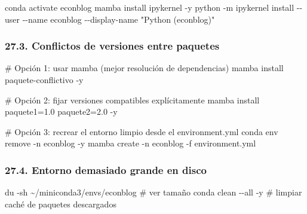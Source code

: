 \documentclass[
  doc,
  floatsintext,
  longtable,
  a4paper,
  nolmodern,
  notxfonts,
  notimes,
  12pt,
  colorlinks=true,linkcolor=blue,citecolor=blue,urlcolor=blue]{apa7}
\newenvironment{Shaded}{\begin{snugshade}}{\end{snugshade}}
\newcommand{\AttributeTok}[1]{\textcolor[rgb]{0.40,0.45,0.13}{#1}}
\newcommand{\CommentTok}[1]{\textcolor[rgb]{0.37,0.37,0.37}{#1}}
\newcommand{\ExtensionTok}[1]{\textcolor[rgb]{0.00,0.23,0.31}{#1}}
\newcommand{\FunctionTok}[1]{\textcolor[rgb]{0.28,0.35,0.67}{#1}}
\newcommand{\NormalTok}[1]{\textcolor[rgb]{0.00,0.23,0.31}{#1}}
\newcommand{\StringTok}[1]{\textcolor[rgb]{0.13,0.47,0.30}{#1}}
\begin{document}
\begin{Shaded}
\begin{Highlighting}[]
\ExtensionTok{conda}\NormalTok{ activate econblog}
\ExtensionTok{mamba}\NormalTok{ install ipykernel }\AttributeTok{{-}y}
\ExtensionTok{python} \AttributeTok{{-}m}\NormalTok{ ipykernel install }\AttributeTok{{-}{-}user} \AttributeTok{{-}{-}name}\NormalTok{ econblog }\AttributeTok{{-}{-}display{-}name} \StringTok{"Python (econblog)"}
\end{Highlighting}
\end{Shaded}

\subsubsection{27.3. Conflictos de versiones entre
paquetes}\label{conflictos-de-versiones-entre-paquetes}

\begin{Shaded}
\begin{Highlighting}[]
\CommentTok{\# Opción 1: usar mamba (mejor resolución de dependencias)}
\ExtensionTok{mamba}\NormalTok{ install paquete{-}conflictivo }\AttributeTok{{-}y}

\CommentTok{\# Opción 2: fijar versiones compatibles explícitamente}
\ExtensionTok{mamba}\NormalTok{ install paquete1=1.0 paquete2=2.0 }\AttributeTok{{-}y}

\CommentTok{\# Opción 3: recrear el entorno limpio desde el environment.yml}
\ExtensionTok{conda}\NormalTok{ env remove }\AttributeTok{{-}n}\NormalTok{ econblog }\AttributeTok{{-}y}
\ExtensionTok{mamba}\NormalTok{ create }\AttributeTok{{-}n}\NormalTok{ econblog }\AttributeTok{{-}f}\NormalTok{ environment.yml}
\end{Highlighting}
\end{Shaded}

\subsubsection{27.4. Entorno demasiado grande en
disco}\label{entorno-demasiado-grande-en-disco}

\begin{Shaded}
\begin{Highlighting}[]
\FunctionTok{du} \AttributeTok{{-}sh}\NormalTok{ \textasciitilde{}/miniconda3/envs/econblog   }\CommentTok{\# ver tamaño}
\ExtensionTok{conda}\NormalTok{ clean }\AttributeTok{{-}{-}all} \AttributeTok{{-}y}                \CommentTok{\# limpiar caché de paquetes descargados}
\end{Highlighting}
\end{Shaded}
\end{document}

